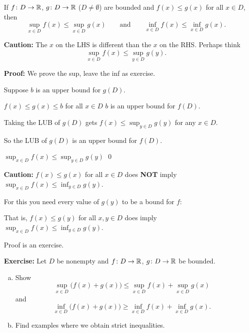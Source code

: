 \documentclass[10pt,aspectratio=169]{beamer}
\begin{document}
\begin{frame}
\begin{proposition}
If $f \colon D \to {\mathbb{R}}$, $g \colon D \to {\mathbb{R}}$ ($D\not= \emptyset$) are
bounded and
$f(x) \leq g(x)$ for all $x \in D$, then
\[
\sup_{x \in D} f(x) \leq \sup_{x \in D} g(x)
\qquad \text{and} \qquad
\inf_{x \in D} f(x) \leq \inf_{x \in D} g(x) .
\]
\end{proposition}

\pause

\textbf{Caution:}
The $x$ on the LHS is different than the $x$ on the RHS. \pause Perhaps think
\[
\sup_{x \in D} f(x) \leq \sup_{y \in D} g(y) .
\]

\pause
\textbf{Proof:} We prove the sup, leave the inf as exercise.

\pause
Suppose $b$ is an upper bound for $g(D)$.

\pause
\thus \quad
$f(x) \leq g(x) \leq b$ for all $x \in D$
\pause
\wthus
$b$ is an upper bound for $f(D)$.

\pause
Taking the LUB of $g(D)$ gets $\displaystyle
f(x) \leq \sup_{y \in D} g(y)$ for any $x \in D$.

\pause
So the LUB of $g(D)$ is an upper bound for $f(D)$.

\pause
\thus \quad
$\displaystyle \sup_{x \in D} f(x) \leq \sup_{y \in D} g(y)$
\qed

\end{frame}

\begin{frame}

\textbf{Caution:}
$f(x) \leq g(x)$ for all $x \in D$ does \textbf{NOT} imply
$\displaystyle
\sup_{x \in D} f(x) \leq \inf_{y \in D} g(y)$.

\medskip
\pause

For this you need every value of $g(y)$ to be a bound for $f$:

\pause
\medskip

That is,
$f(x) \leq g(y)$ for all $x,y \in D$ does imply
$\displaystyle
\sup_{x \in D} f(x) \leq \inf_{y \in D} g(y)$.

\pause
\medskip

Proof is an exercise.

\end{frame}

\begin{frame}

\textbf{Exercise:}
Let $D$ be nonempty and
$f \colon D \to {\mathbb{R}}$, $g \colon D \to {\mathbb{R}}$ be bounded.
\begin{enumerate}[a)]
\item
\pause
Show 
\[
\sup_{x\in D} \bigl(f(x) + g(x) \bigr) \leq
\sup_{x\in D} f(x)
+
\sup_{x\in D} g(x)
\]
\pause
and
\[
\inf_{x\in D} \bigl(f(x) + g(x) \bigr) \geq
\inf_{x\in D} f(x)
+
\inf_{x\in D} g(x) .
\]
\item
\pause
Find examples where we obtain strict inequalities.
\end{enumerate}

\end{frame}
\end{document}
